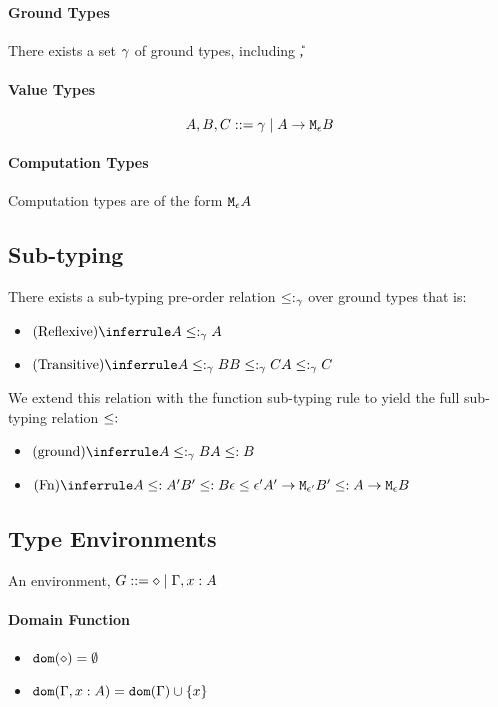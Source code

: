 {        \paragraph{Ground Types}
            There exists a set $\gamma$ of ground types, including \U, \B
        \paragraph{Value Types}
        $$ A, B, C ::= \gamma \mid A \rightarrow \texttt{M}_{\epsilon}{B} $$
        \paragraph{Computation Types}
        Computation types are of the form $\texttt{M}_{\epsilon}{A}$
    
    \subsection{Sub-typing}
        There exists a sub-typing pre-order relation $\leq:_{\gamma}$ over ground types that is:
        \begin{itemize}
            \item $\ntreerulez{Reflexive}{A \subtype_{\ground} A}$
            \item $\ntreeruleII{Transitive}{A \subtype_{\ground} B }{ B \subtype_{\ground} C}{A \subtype_{\ground} C}$
        \end{itemize}
    
        We extend this relation with the function sub-typing rule to yield the full sub-typing relation $\leq:$
    
        \begin{itemize}
            \item $\ntreeruleI{ground}{A \subtype_{\ground} B}{A \subtype B}$
            \item $\ntreeruleII{Fn}{A \subtype A' }{ B' \subtype B }{ \e \subeffect \e'}{\lamtype{A'}{\e'}{B'} \subtype \aeb}$
        \end{itemize}
    \subsection{Type Environments}
    An environment, $G ::= \diamond \mid \Gamma, x: A$ 
    \paragraph{Domain Function}
    \begin{itemize}
        \item $\texttt{dom}(\diamond) = \emptyset$
        \item $\texttt{dom}(\Gamma, x: A) =  \texttt{dom}(\Gamma)  \cup \left\{x \right\}$
    \end{itemize}
}
